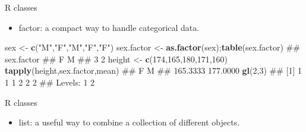\documentclass[ignorenonframetext,]{beamer}
\newenvironment{Shaded}{\begin{snugshade}}{\end{snugshade}}
\newcommand{\KeywordTok}[1]{\textcolor[rgb]{0.13,0.29,0.53}{\textbf{{#1}}}}
\newcommand{\DataTypeTok}[1]{\textcolor[rgb]{0.13,0.29,0.53}{{#1}}}
\newcommand{\DecValTok}[1]{\textcolor[rgb]{0.00,0.00,0.81}{{#1}}}
\newcommand{\StringTok}[1]{\textcolor[rgb]{0.31,0.60,0.02}{{#1}}}
\newcommand{\NormalTok}[1]{{#1}}
\begin{document}
\begin{frame}[fragile]{R classes}

\begin{itemize}
\itemsep1pt\parskip0pt
\item
  factor: a compact way to handle categorical data.
\end{itemize}

\begin{Shaded}
\begin{Highlighting}[]
\NormalTok{sex <-}\StringTok{ }\KeywordTok{c}\NormalTok{(}\StringTok{"M"}\NormalTok{,}\StringTok{"F"}\NormalTok{,}\StringTok{"M"}\NormalTok{,}\StringTok{"F"}\NormalTok{,}\StringTok{"F"}\NormalTok{)}
\NormalTok{sex.factor <-}\StringTok{ }\KeywordTok{as.factor}\NormalTok{(sex);}\KeywordTok{table}\NormalTok{(sex.factor)}
\NormalTok{## sex.factor}
\NormalTok{## F M }
\NormalTok{## 3 2}
\NormalTok{height <-}\StringTok{ }\KeywordTok{c}\NormalTok{(}\DecValTok{174}\NormalTok{,}\DecValTok{165}\NormalTok{,}\DecValTok{180}\NormalTok{,}\DecValTok{171}\NormalTok{,}\DecValTok{160}\NormalTok{)}
\KeywordTok{tapply}\NormalTok{(height,sex.factor,mean)}
\NormalTok{##        F        M }
\NormalTok{## 165.3333 177.0000}
\KeywordTok{gl}\NormalTok{(}\DecValTok{2}\NormalTok{,}\DecValTok{3}\NormalTok{)}
\NormalTok{## [1] 1 1 1 2 2 2}
\NormalTok{## Levels: 1 2}
\end{Highlighting}
\end{Shaded}

\end{frame}

\begin{frame}[fragile]{R classes}

\begin{itemize}
\itemsep1pt\parskip0pt
\item
  list: a useful way to combine a collection of different objects.
\end{itemize}

\begin{Shaded}
\end{Shaded}

\end{frame}
\end{document}
